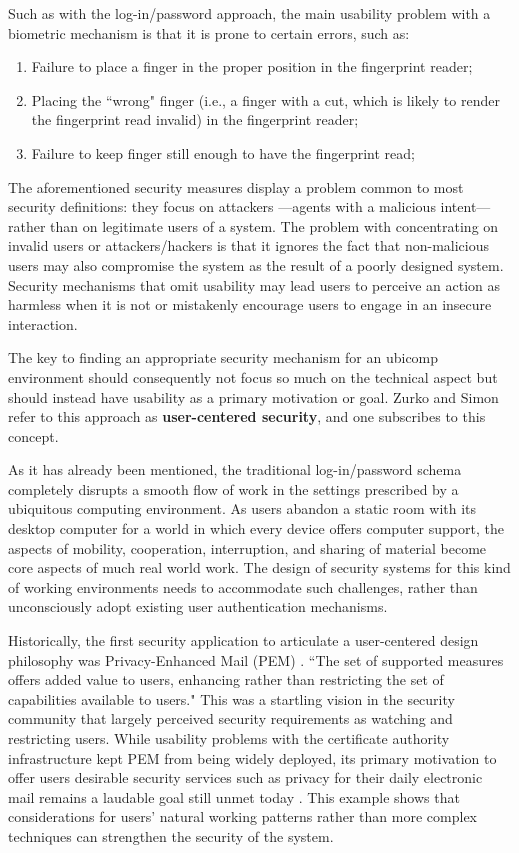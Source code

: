 \documentclass{article}
\begin{document}
Such as with the log-in/password approach, the main usability problem with a biometric mechanism is that it is prone to certain errors, such as:
\begin{enumerate}
\item Failure to place a finger in the proper position in the fingerprint reader;
\item Placing the ``wrong" finger (i.e., a finger with a cut, which is likely to render the fingerprint read invalid) in the fingerprint reader;
\item Failure to keep finger still enough to have the fingerprint read;
\end{enumerate}

The aforementioned security measures display a problem common to most security definitions: they focus on attackers ---agents with a malicious intent--- rather than on legitimate users of a system. The problem with concentrating on invalid users or attackers/hackers is that it ignores the fact that non-malicious users may also compromise the system as the result of a poorly designed system.  Security mechanisms that omit usability may lead users to perceive an action as harmless when it is not or mistakenly encourage users to engage in an insecure interaction. 

The key to finding an appropriate security mechanism for an ubicomp environment should consequently not focus so much on the technical aspect but should instead have usability as a primary motivation or goal.  Zurko and Simon \cite{zurko1996user} refer to this approach as \textbf{user-centered security}, and one subscribes to this concept. 

As it has already been mentioned, the traditional log-in/password schema completely disrupts a smooth flow of work in the settings prescribed by a ubiquitous computing environment. As users abandon a static room with its desktop computer for a world in which every device offers computer support, the aspects of mobility, cooperation, interruption, and sharing of material become core aspects of much real world work. The design of security systems for this kind of working environments needs to accommodate such challenges, rather than unconsciously adopt existing user authentication mechanisms.

Historically, the first security application to articulate a user-centered design philosophy was Privacy-Enhanced Mail (PEM) \cite{linn1993privacy}. ``The set of supported measures offers added value to users, enhancing rather than restricting the set of capabilities available to users." This was a startling vision in the security community that largely perceived security requirements as watching and restricting users. While usability problems with the certificate authority infrastructure kept PEM from being widely deployed, its primary motivation to offer users desirable security services such as privacy for their daily electronic mail remains a laudable goal still  unmet today \cite{zurko1996user}.  This example shows that considerations for users' natural working patterns rather than more complex techniques can strengthen the security of the system.
\end{document}
